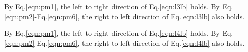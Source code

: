 By Eq.\eqref{eqn:pm1}, the left to right direction of 
Eq.\eqref{eqn:l3lb} holds. By Eq.\eqref{eqn:pm2}-Eq.\eqref{eqn:pm6}, the right to left 
direction of Eq.\eqref{eqn:l3lb} also holds.

By Eq.\eqref{eqn:pm1}, the left to right direction of 
Eq.\eqref{eqn:l4lb} holds. By Eq.\eqref{eqn:pm2}-Eq.\eqref{eqn:pm6}, the right to left 
direction of Eq.\eqref{eqn:l4lb} also holds.




